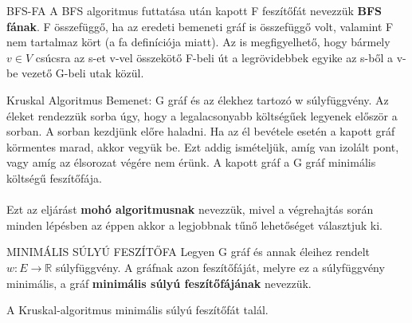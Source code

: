 \begin{definicio}{BFS-FA}
A BFS algoritmus futtatása után kapott F feszítőfát nevezzük \textbf{BFS fának}. F összefüggő, ha az eredeti bemeneti gráf is összefüggő volt, valamint F nem tartalmaz kört (a fa definíciója miatt). Az is megfigyelhető, hogy bármely $v \in V$ csúcsra az s-et v-vel összekötő F-beli út a legrövidebbek egyike az s-ből a v-be vezető G-beli utak közül.
\end{definicio}

\begin{tetel}{Kruskal Algoritmus}
Bemenet: G gráf és az élekhez tartozó w súlyfüggvény. Az éleket rendezzük sorba úgy, hogy a legalacsonyabb költségűek legyenek először a sorban. A sorban kezdjünk előre haladni. Ha az él bevétele esetén a kapott gráf körmentes marad, akkor vegyük be. Ezt addig ismételjük, amíg van izolált pont, vagy amíg az élsorozat végére nem érünk. A kapott gráf a G gráf minimális költségű feszítőfája.
\\
\\
Ezt az eljárást \textbf{mohó algoritmusnak} nevezzük, mivel a végrehajtás során minden lépésben az éppen akkor a legjobbnak tűnő lehetőséget választjuk ki.
\end{tetel}

\begin{definicio}{MINIMÁLIS SÚLYÚ FESZÍTŐFA}
Legyen G gráf és annak éleihez rendelt $w: E \rightarrow \mathbb{R}$ súlyfüggvény. A gráfnak azon feszítőfáját, melyre ez a súlyfüggvény minimális, a gráf \textbf{minimális súlyú feszítőfájának} nevezzük.
\end{definicio}

\begin{tetel}{}
A Kruskal-algoritmus minimális súlyú feszítőfát talál.
\end{tetel}

